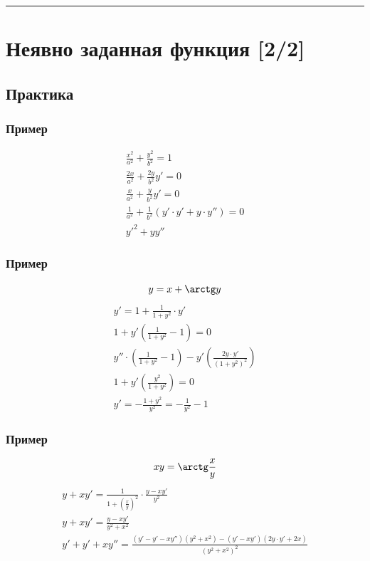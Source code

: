 \documentclass{article}
\begin{document}
\par\noindent\rule{\textwidth}{1pt}
\section{Неявно заданная функция [2/2]}

\subsection{Практика}

\subsubsection{Пример}
\begin{gather*}
    \frac{x^2}{a^2} + \frac{y^2}{b^2} = 1 \\
    \frac{2x}{a^2} + \frac{2y}{b^2}y' = 0 \\
    \frac{x}{a^2} + \frac{y}{b^2}y' = 0 \\
    \frac{1}{a^2} + \frac{1}{b^2} \left( y' \cdot y' + y \cdot y'' \right) = 0 \\
    y'^2 + yy''
\end{gather*}

\subsubsection{Пример}
\[
    y = x + \arctg y
\]
\begin{gather*}
    y' = 1 + \frac{1}{1 + y^2} \cdot y' \\
    1 + y' \left( \frac{1}{1 + y^2} - 1\right) = 0 \\
    y'' \cdot \left( \frac{1}{1 + y^2} - 1 \right) - y' \left( \frac{2y \cdot y'}{(1 + y^2)^2} \right) \\
    1 + y' \left( \frac{y^2}{1 + y^2} \right) = 0 \\
    y' = -\frac{1 + y^2}{y^2} = -\frac{1}{y^2} - 1
\end{gather*}

\subsubsection{Пример}
\[
    xy = \arctg \frac{x}{y}
\]
\begin{gather*}
    y + xy' = \frac{1}{1 + \left( \frac{x}{y} \right)^2} \cdot \frac{y - xy'}{y^2} \\
    y + xy' = \frac{y - xy'}{y^2 + x^2} \\
    y' + y' + xy'' = \frac{(y' - y' - xy'')(y^2 + x^2) - (y' - xy')(2y \cdot y' + 2x)}{(y^2 + x^2)^2}
\end{gather*}
\end{document}
